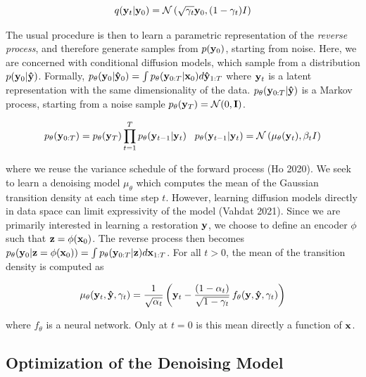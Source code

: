 \documentclass{article}
\begin{document}
\begin{equation}
q(\bold{y}_t|\bold{y}_0) = \mathcal{N} \left(\sqrt{\gamma_{t}} \bold{y}_{0}, (1 - \gamma_t)I \right)
\end{equation}


The usual procedure is then to learn a parametric representation of the \emph{reverse process}, and therefore generate samples from  $p(\bold{y}_{0})$, starting from noise. Here, we are concerned with conditional diffusion models, which sample from a distribution $p(\bold{y}_{0}|\bold{\hat{y}})$. Formally, $p_{\theta}(\bold{y}_{0}|\bold{\hat{y}}_{0}) = \int p_{\theta}(\bold{y}_{0:T}|\bold{x}_{0})d\bold{\hat{y}}_{1:T}$ where $\bold{y}_{t}$ is a latent representation with the same dimensionality of the data.  $p_{\theta}(\bold{y}_{0:T}|\bold{\hat{y}})$ is a Markov process, starting from a noise sample $p_{\theta}(\bold{y}_{T}) = \mathcal{N}(0,\bold{I})$. 

\begin{equation}
p_{\theta}(\bold{y}_{0:T}) = p_{\theta}(\bold{y}_{T})\prod_{t=1}^{T} p_{\theta}(\bold{y}_{t-1}|\bold{y}_{t}) \;\;\; p_{\theta}(\bold{y}_{t-1}|\bold{y}_{t}) = \mathcal{N}\left(\mu_{\theta}(\bold{y}_{t}),\beta_{t}I\right)
\end{equation}

where we reuse the variance schedule of the forward process (Ho 2020). We seek to learn a denoising model $\mu_{\theta}$ which computes the mean of the Gaussian transition density at each time step $t$. However, learning diffusion models directly in data space can limit expressivity of the model (Vahdat 2021). Since we are primarily interested in learning a restoration $\bold{y}$, we choose to define an encoder $\phi$ such that $\bold{z} = \phi(\bold{x}_{0})$. The reverse process then becomes $p_{\theta}(\bold{y}_{0}|\bold{z}=\phi(\bold{x}_{0})) = \int p_{\theta}(\bold{y}_{0:T}|\bold{z})d\bold{x}_{1:T}$. For all $t > 0$, the mean of the transition density is computed as

\begin{equation}
\mu_{\theta}(\bold{y}_t, \bold{\hat{y}}, \gamma_t) = \frac{1}{\sqrt{\alpha_t}} \left(\bold{y}_t - \frac{(1 - \alpha_t)}{\sqrt{1 - \gamma_t}} \, f_{\theta}(\bold{y}, \bold{\hat{y}}, \gamma_t) \right)
\end{equation}

where $f_{\theta}$ is a neural network. Only at $t=0$ is this mean directly a function of $\bold{x}$. 

\subsection{Optimization of the Denoising Model}
\end{document}
